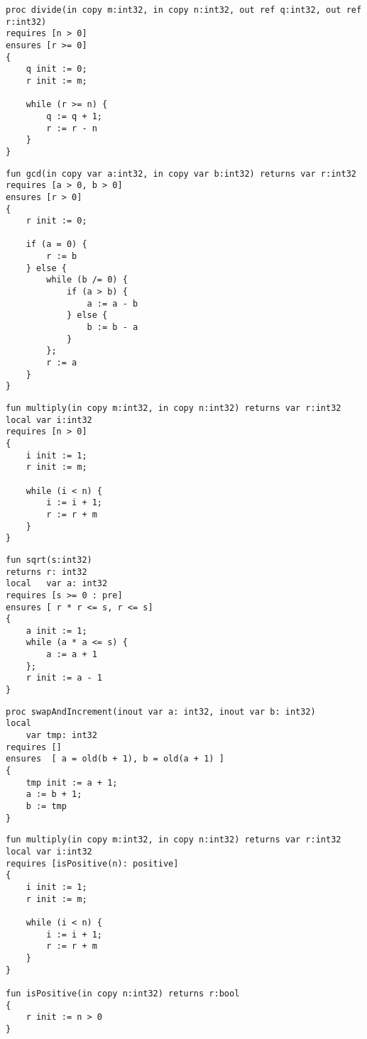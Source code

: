
\begin{lstlisting}[caption=Pre-/postconditions in Prozeduren]
proc divide(in copy m:int32, in copy n:int32, out ref q:int32, out ref r:int32)
requires [n > 0]
ensures [r >= 0]
{
    q init := 0;
    r init := m;

    while (r >= n) {
        q := q + 1;
        r := r - n
    }
}
\end{lstlisting}

\begin{lstlisting}[caption=Pre-/postconditions in Funktionen mit mehreren Conditions]
fun gcd(in copy var a:int32, in copy var b:int32) returns var r:int32
requires [a > 0, b > 0]
ensures [r > 0]
{
    r init := 0;
    
    if (a = 0) {
        r := b
    } else {
        while (b /= 0) {
            if (a > b) {
                a := a - b
            } else {
                b := b - a
            }
        };
        r := a
    }
}
\end{lstlisting}

\begin{lstlisting}[caption=Pre-/postconditions in Funktionen]
fun multiply(in copy m:int32, in copy n:int32) returns var r:int32
local var i:int32
requires [n > 0]
{
    i init := 1;
    r init := m;

    while (i < n) {
        i := i + 1;
        r := r + m
    }
}
\end{lstlisting}

\begin{lstlisting}[caption=Berechnen einer ganzzahligen Quadratwurzel. Verwendung mehrerer Conditions]
fun sqrt(s:int32)
returns r: int32
local   var a: int32
requires [s >= 0 : pre]
ensures [ r * r <= s, r <= s]
{
    a init := 1;
    while (a * a <= s) {
        a := a + 1
    };      
    r init := a - 1
}
\end{lstlisting}

\begin{lstlisting}[caption=Evaluieren einer Expression im preexecution State]
proc swapAndIncrement(inout var a: int32, inout var b: int32)
local 
    var tmp: int32
requires []
ensures  [ a = old(b + 1), b = old(a + 1) ]
{
    tmp init := a + 1;
    a := b + 1;
    b := tmp
}
\end{lstlisting}

\begin{lstlisting}[caption=Pre-/postconditions mit Funktion in der Condition List und Label]
fun multiply(in copy m:int32, in copy n:int32) returns var r:int32
local var i:int32
requires [isPositive(n): positive]
{
    i init := 1;
    r init := m;

    while (i < n) {
        i := i + 1;
        r := r + m
    }
}

fun isPositive(in copy n:int32) returns r:bool
{
    r init := n > 0
}
\end{lstlisting}

